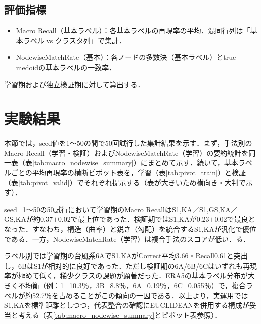\documentclass{jarticle}
\theoremstyle{definition}
\begin{document}
\subsection{評価指標}
\begin{itemize}
\item Macro Recall（基本ラベル）：各基本ラベルの再現率の平均．混同行列は「基本ラベル vs クラスタ列」で集計．
\item NodewiseMatchRate（基本）：各ノードの多数決（基本ラベル）とtrue medoidの基本ラベルの一致率．
\end{itemize}
学習期および独立検証期に対して算出する．

\section{実験結果}
本節では，seed値を1〜50の間で50回試行した集計結果を示す．まず，手法別のMacro Recall（学習・検証）およびNodewiseMatchRate（学習）の要約統計を同一表（表\ref{tab:macro_nodewise_summary}）にまとめて示す．続いて，基本ラベルごとの平均再現率の横断ピボット表を，学習（表\ref{tab:pivot_train}）と検証（表\ref{tab:pivot_valid}）でそれぞれ提示する（表が大きいため横向き・大判で示す）．

seed=1〜50の50試行において学習期のMacro RecallはS1,KA／S1,GS,KA／GS,KAが約0.37$\pm$0.02で最上位であった．検証期ではS1,KAが0.23$\pm$0.02で最良となった．すなわち，構造（曲率）と鋭さ（勾配）を統合するS1,KAが汎化で優位である．一方，NodewiseMatchRate（学習）は複合手法のスコアが低い．る．

ラベル別では学習期の台風系6AでS1,KAがCorrect平均3.66・Recall0.61と突出し，6BはS1が相対的に良好であった．ただし検証期の6A/6B/6Cはいずれも再現率が極めて低く，稀少クラスの課題が顕著だった．ERA5の基本ラベル分布が大きく不均衡（例：1=10.3％，3B=8.8％，6A=0.19％，6C=0.055％）で，複合ラベルが約52.7％を占めることがこの傾向の一因である．以上より，実運用ではS1,KAを標準距離としつつ，代表整合の確認にEUCLIDEANを併用する構成が妥当と考える（表\ref{tab:macro_nodewise_summary}とピボット表参照）．
\end{document}
